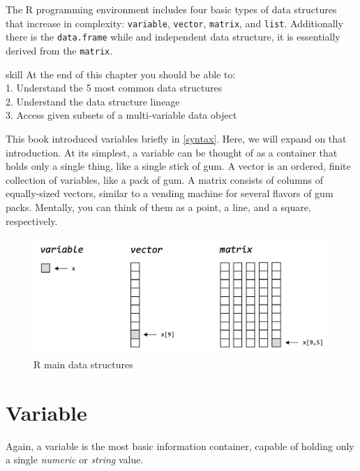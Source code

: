 \documentclass[
]{book}
\begin{document}
The R programming environment includes four basic types of data structures that increase in complexity: \texttt{variable}, \texttt{vector}, \texttt{matrix}, and \texttt{list}. Additionally there is the \texttt{data.frame} while and independent data structure, it is essentially derived from the \texttt{matrix}.

\begin{infobox}{skill}
At the end of this chapter you should be able to:\\
1. Understand the 5 most common data structures\\
2. Understand the data structure lineage\\
3. Access given subsets of a multi-variable data object\\


\end{infobox}

\hfill\break
This book introduced variables briefly in \ref{syntax}. Here, we will expand on that introduction. At its simplest, a variable can be thought of as a container that holds only a single thing, like a single stick of gum. A vector is an ordered, finite collection of variables, like a pack of gum. A matrix consists of columns of equally-sized vectors, similar to a vending machine for several flavors of gum packs. Mentally, you can think of them as a point, a line, and a square, respectively.

\begin{figure}

{\centering \includegraphics[width=0.67\linewidth]{images/04_001_data_structures} 

}

\caption{\label{fig:4001}R main data structures}\label{fig:4001}
\end{figure}

\hypertarget{variable}{%
\section{Variable}\label{variable}}

Again, a variable is the most basic information container, capable of holding only a single \emph{numeric} or \emph{string} value.
\end{document}
